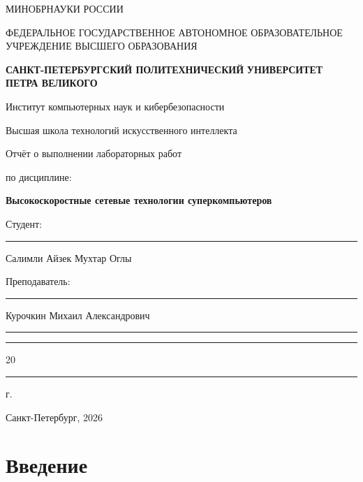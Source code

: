 \documentclass[areasetadvanced]{scrartcl}
\begin{document}
\sloppy
	\thispagestyle{empty}
	\begin{center}
	\large{МИНОБРНАУКИ РОССИИ} \par
	\vspace{0.3cm}
	\normalsize
	{ФЕДЕРАЛЬНОЕ ГОСУДАРСТВЕННОЕ АВТОНОМНОЕ ОБРАЗОВАТЕЛЬНОЕ УЧРЕЖДЕНИЕ ВЫСШЕГО ОБРАЗОВАНИЯ} \par
	\vspace{0.3cm}
	\textbf{САНКТ-ПЕТЕРБУРГСКИЙ ПОЛИТЕХНИЧЕСКИЙ}
	\textbf{УНИВЕРСИТЕТ ПЕТРА ВЕЛИКОГО} \par
	\vspace{0.3cm}
	{Институт компьютерных наук и кибербезопасности}\par
	{Высшая школа технологий искусственного интеллекта}\par
\end{center}
\vfill
\begin{center}
	{\huge Отчёт о выполнении лабораторных работ}\par
    \huge {по дисциплине:}\par
    \vspace{0.3cm}
	\Huge \textbf{Высокоскоростные сетевые технологии суперкомпьютеров}\par
\end{center}
\vfill
\begin{flushleft}
	Студент: \hspace{1.8cm} \rule[0pt]{2.5cm}{0.5pt}\hfill Салимли Айзек Мухтар Оглы\par
	\vspace{1.5cm}
	Преподаватель: \hspace{0.55cm} \rule[0pt]{2.5cm}{0.5pt}\hfill  Курочкин Михаил Александрович
\end{flushleft}
\vspace{0.5cm}
\begin{flushright}
	\guillemotleft \rule[0pt]{0.8cm}{0.5pt}\guillemotright \rule[0pt]{2cm}{0.5pt} 20\rule[0pt]{0.5cm}{0.5pt} г.
\end{flushright}
\vfill
\begin{center}
	Санкт-Петербург, 2026
\end{center}

\newpage
\tableofcontents

\newpage
\section*{Введение}
\end{document}
